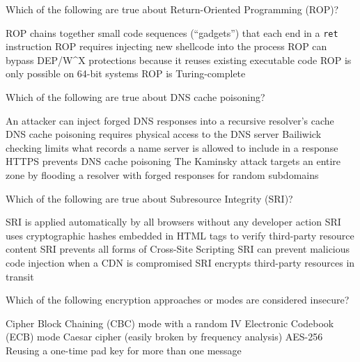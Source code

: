 \documentclass[addpoints]{exam}
\begin{document}
\begin{questions}
\question Which of the following are true about Return-Oriented Programming (ROP)?

\begin{checkboxes}
  \CorrectChoice ROP chains together small code sequences (``gadgets'') that each end in a \texttt{ret} instruction
  \choice ROP requires injecting new shellcode into the process
  \CorrectChoice ROP can bypass DEP/W\^{}X protections because it reuses existing executable code
  \choice ROP is only possible on 64-bit systems
  \CorrectChoice ROP is Turing-complete
\end{checkboxes}



\question Which of the following are true about DNS cache poisoning?

\begin{checkboxes}
  \CorrectChoice An attacker can inject forged DNS responses into a recursive resolver's cache
  \choice DNS cache poisoning requires physical access to the DNS server
  \CorrectChoice Bailiwick checking limits what records a name server is allowed to include in a response
  \choice HTTPS prevents DNS cache poisoning
  \CorrectChoice The Kaminsky attack targets an entire zone by flooding a resolver with forged responses for random subdomains
\end{checkboxes}


\question Which of the following are true about Subresource Integrity (SRI)?

\begin{checkboxes}
  \choice SRI is applied automatically by all browsers without any developer action
  \CorrectChoice SRI uses cryptographic hashes embedded in HTML tags to verify third-party resource content
  \choice SRI prevents all forms of Cross-Site Scripting
  \CorrectChoice SRI can prevent malicious code injection when a CDN is compromised
  \choice SRI encrypts third-party resources in transit
\end{checkboxes}



\question Which of the following encryption approaches or modes are considered insecure?

\begin{checkboxes}
  \choice Cipher Block Chaining (CBC) mode with a random IV
  \CorrectChoice Electronic Codebook (ECB) mode
  \CorrectChoice Caesar cipher (easily broken by frequency analysis)
  \choice AES-256
  \CorrectChoice Reusing a one-time pad key for more than one message
\end{checkboxes}




\end{questions}
\end{document}
